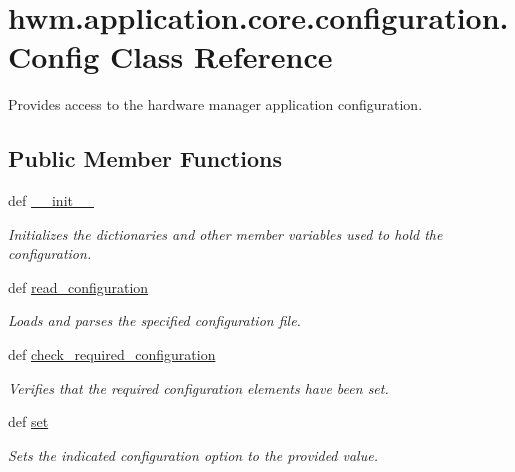 \hypertarget{classhwm_1_1application_1_1core_1_1configuration_1_1_config}{\section{hwm.\-application.\-core.\-configuration.\-Config Class Reference}
\label{classhwm_1_1application_1_1core_1_1configuration_1_1_config}
}


Provides access to the hardware manager application configuration.  


\subsection*{Public Member Functions}
\begin{DoxyCompactItemize}
\item 
def \hyperlink{classhwm_1_1application_1_1core_1_1configuration_1_1_config_a3c02c2e10c41767410bebeb41bfa838f}{\-\_\-\-\_\-init\-\_\-\-\_\-}
\begin{DoxyCompactList}\small\item\em Initializes the dictionaries and other member variables used to hold the configuration. \end{DoxyCompactList}\item 
def \hyperlink{classhwm_1_1application_1_1core_1_1configuration_1_1_config_a2cff927849cae7f420086dd93efc0466}{read\-\_\-configuration}
\begin{DoxyCompactList}\small\item\em Loads and parses the specified configuration file. \end{DoxyCompactList}\item 
def \hyperlink{classhwm_1_1application_1_1core_1_1configuration_1_1_config_abc7cdccad6ab2ff1a2106bec0298c492}{check\-\_\-required\-\_\-configuration}
\begin{DoxyCompactList}\small\item\em Verifies that the required configuration elements have been set. \end{DoxyCompactList}\item 
def \hyperlink{classhwm_1_1application_1_1core_1_1configuration_1_1_config_aedbf8bf0f65b4005f82c7cf8aad89fd0}{set}
\begin{DoxyCompactList}\small\item\em Sets the indicated configuration option to the provided value. \end{DoxyCompactList}\item 

\end{DoxyCompactItemize}
